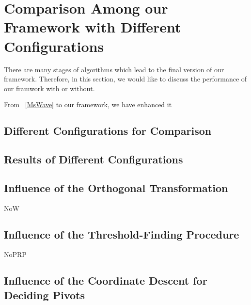 


\section{Comparison Among our Framework with Different Configurations} %
\label{s:comparison_among_our_framework_with_different_configurations}

There are many stages of algorithms which lead to the final version of our framework.  Therefore, in this section, we would like to discuss the performance of our framwork with or without.

From ~\ref{MsWave} to our framework, we have enhanced it

\subsection{Different Configurations for Comparison} %
\label{sub:different_configurations_for_comparison}



\subsection{Results of Different Configurations} %
\label{sub:results_of_different_configs}




\subsection{Influence of the Orthogonal Transformation} %
\label{ss:influence_of_the_orthogonal_transformation}

NoW

\subsection{Influence of the Threshold-Finding Procedure} %
\label{sub:influence_of_the_threshold_finding_procedure}

NoPRP

\subsection{Influence of the Coordinate Descent for Deciding Pivots} %
\label{sub:influence_of_the_decision_of_pivots}

